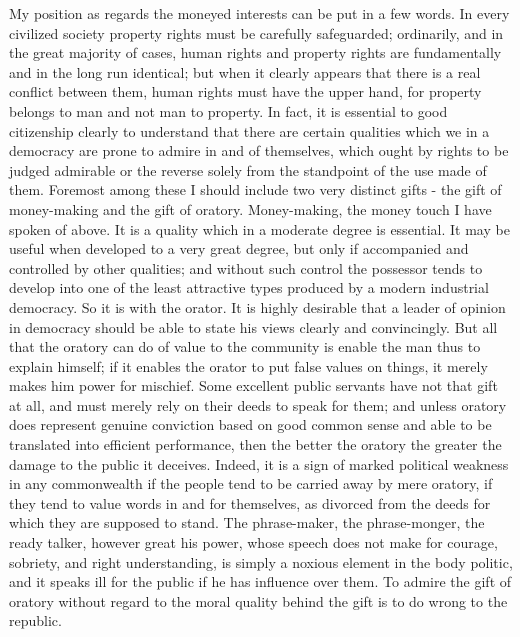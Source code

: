 \documentclass{scrbook}
\begin{document}
My position as regards the moneyed interests can be put in a few words. In every
civilized society property rights must be carefully safeguarded; ordinarily, and in the great
majority of cases, human rights and property rights are fundamentally and in the long run
identical; but when it clearly appears that there is a real conflict between them, human
rights must have the upper hand, for property belongs to man and not man to property. In
fact, it is essential to good citizenship clearly to understand that there are certain qualities
which we in a democracy are prone to admire in and of themselves, which ought by rights
to be judged admirable or the reverse solely from the standpoint of the use made of them.
Foremost among these I should include two very distinct gifts - the gift of money-making
and the gift of oratory. Money-making, the money touch I have spoken of above. It is a
quality which in a moderate degree is essential. It may be useful when developed to a very
great degree, but only if accompanied and controlled by other qualities; and without such
control the possessor tends to develop into one of the least attractive types produced by a
modern industrial democracy. So it is with the orator. It is highly desirable that a leader
of opinion in democracy should be able to state his views clearly and convincingly. But
all that the oratory can do of value to the community is enable the man thus to explain
himself; if it enables the orator to put false values on things, it merely makes him power
for mischief. Some excellent public servants have not that gift at all, and must merely
rely on their deeds to speak for them; and unless oratory does represent genuine conviction
based on good common sense and able to be translated into efficient performance, then the
better the oratory the greater the damage to the public it deceives. Indeed, it is a sign of
marked political weakness in any commonwealth if the people tend to be carried away by
mere oratory, if they tend to value words in and for themselves, as divorced from the deeds
for which they are supposed to stand. The phrase-maker, the phrase-monger, the ready
talker, however great his power, whose speech does not make for courage, sobriety, and
right understanding, is simply a noxious element in the body politic, and it speaks ill for
the public if he has influence over them. To admire the gift of oratory without regard to the
moral quality behind the gift is to do wrong to the republic.
\end{document}
